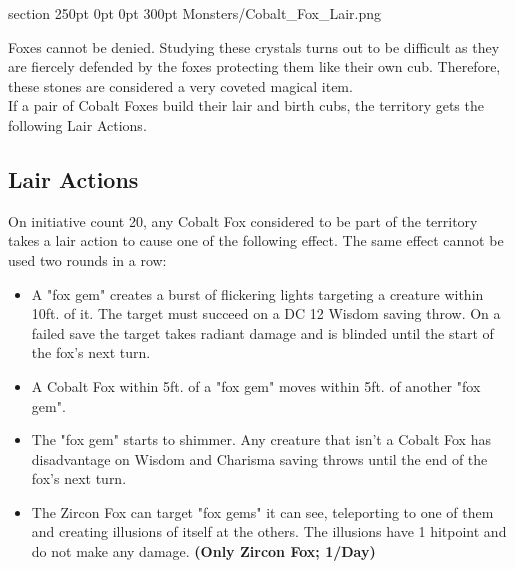 
\MonsterBannerGraphic%
	{}%
	{section}
	{250pt}%
	{0pt} %
	{0pt} %
	{300pt}%
	{Monsters/Cobalt_Fox_Lair.png}%
	{}%
	
%
	
\noindent Foxes cannot be denied. Studying these crystals turns out to be difficult as they are fiercely defended by the foxes protecting them like their own cub. Therefore, these stones are considered a very coveted magical item.\\
If a pair of Cobalt Foxes build their lair and birth cubs, the territory gets the following Lair Actions.

\subsection*{Lair Actions}
On initiative count 20, any Cobalt Fox considered to be part of the territory takes a lair action to cause one of the following effect. The same effect cannot be used two rounds in a row:
\begin{itemize}
	\item A "fox gem" creates a burst of flickering lights targeting a creature within 10ft. of it. The target must succeed on a DC 12 Wisdom saving throw. On a failed save the target takes  radiant damage and is blinded until the start of the fox's next turn.
	\item A Cobalt Fox within 5ft. of a "fox gem" moves within 5ft. of another "fox gem".
	\item The "fox gem" starts to shimmer. Any creature that isn't a Cobalt Fox has disadvantage on Wisdom and Charisma saving throws until the end of the fox's next turn.
	\item The Zircon Fox can target  "fox gems" it can see, teleporting to one of them and creating illusions of itself at the others. The illusions have 1 hitpoint and do not make any damage. \textbf{(Only Zircon Fox; 1/Day)}
\end{itemize}

